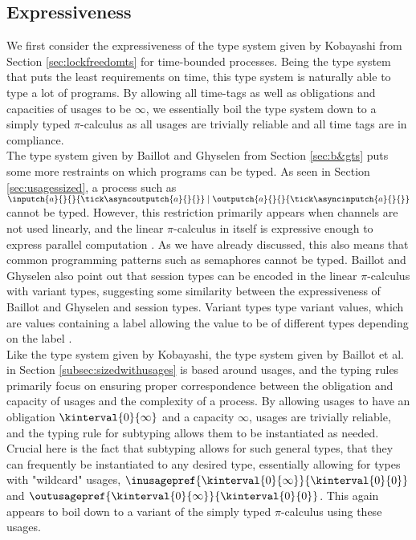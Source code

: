 \subsection{Expressiveness}
We first consider the expressiveness of the type system given by Kobayashi from Section \ref{sec:lockfreedomts} for time-bounded processes. Being the type system that puts the least requirements on time, this type system is naturally able to type a lot of programs. By allowing all time-tags as well as obligations and capacities of usages to be $\infty$, we essentially boil the type system down to a simply typed $\pi$-calculus as all usages are trivially reliable and all time tags are in compliance.\\

The type system given by Baillot and Ghyselen from Section \ref{sec:b&gts} puts some more restraints on which programs can be typed. As seen in Section \ref{sec:usagessized}, a process such as $\inputch{a}{}{}{\tick\asyncoutputch{a}{}{}} \mid \outputch{a}{}{}{\tick\asyncinputch{a}{}{}}$ cannot be typed. However, this restriction primarily appears when channels are not used linearly, and the linear $\pi$-calculus in itself is expressive enough to express parallel computation \cite{PiCalculusLinearity}. As we have already discussed, this also means that common programming patterns such as semaphores cannot be typed. Baillot and Ghyselen also point out that session types can be encoded in the linear $\pi$-calculus with variant types, suggesting some similarity between the expressiveness of Baillot and Ghyselen and session types. Variant types type variant values, which are values containing a label allowing the value to be of different types depending on the label \cite{sangiorgiVariantTypes}.\\

Like the type system given by Kobayashi, the type system given by Baillot et al. in Section \ref{subsec:sizedwithusages} is based around usages, and the typing rules primarily focus on ensuring proper correspondence between the obligation and capacity of usages and the complexity of a process. By allowing usages to have an obligation $\kinterval{0}{\infty}$ and a capacity $\infty$, usages are trivially reliable, and the typing rule for subtyping allows them to be instantiated as needed. Crucial here is the fact that subtyping allows for such general types, that they can frequently be instantiated to any desired type, essentially allowing for types with "wildcard" usages, $\inusagepref{\kinterval{0}{\infty}}{\kinterval{0}{0}}$ and $\outusagepref{\kinterval{0}{\infty}}{\kinterval{0}{0}}$. This again appears to boil down to a variant of the simply typed $\pi$-calculus using these usages.\\

